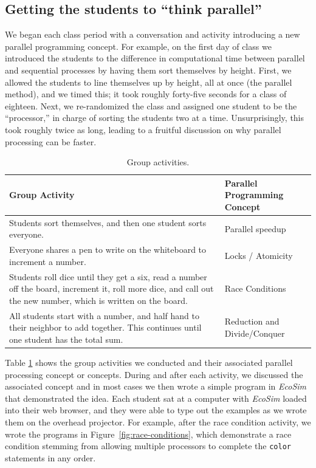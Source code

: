 \documentclass{sig-alternate}
\begin{document}
\subsection{Getting the students to ``think parallel''}
We began each class period with a conversation and activity introducing a new parallel programming concept. 
For example, on the first day of class we introduced the students to the difference in
computational time between parallel and sequential processes by having them sort themselves
by height.  First, we allowed the students to line themselves up by height, all at once (the
parallel method), and we timed this; it took roughly forty-five seconds for a class of eighteen.
Next, we re-randomized the class and assigned one student to be the ``processor,'' in charge
of sorting the students two at a time.  Unsurprisingly, this took roughly twice as long, 
leading to a fruitful discussion on why parallel processing can be faster.

\begin{table}
\centering \begin{tabular}{p{.7\linewidth} | p{.25\linewidth}} 
\toprule
Group Activity               &  Parallel Programming Concept \\ \midrule
Students sort themselves, and then one student sorts everyone.     & Parallel speedup \\ \hline
Everyone shares a pen to write on the whiteboard to increment a number. & Locks / Atomicity  \\ \hline
Students roll dice until they get a six, read a number off the board, increment it, roll more dice, and call out the new number, which is written on the board.   & Race Conditions \\ \hline
All students start with a number, and half hand to their neighbor to add together.
This continues until one student has the total sum. & Reduction and Divide/Conquer  \\
\bottomrule 
\end{tabular}
\caption{Group activities.}
\label{tab:group-activities}
\end{table} 

Table \ref{tab:group-activities} shows the group activities we conducted and their associated
parallel processing concept or concepts.  During and after each activity, we discussed the
associated concept and in most cases we then wrote a simple program in \emph{EcoSim} that
demonstrated the idea.  Each student sat at a computer with \emph{EcoSim} loaded into their
web browser, and they were able to type out the examples as we wrote them on the overhead 
projector.
For example, after the race condition activity, we wrote the programs in 
Figure~\ref{fig:race-conditions}, which demonstrate a race condition stemming from allowing multiple
processors to complete the \texttt{color} statements in any order.
\end{document}
